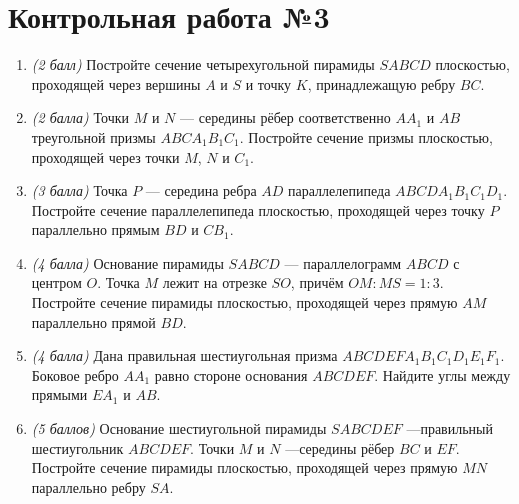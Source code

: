 \documentclass[12pt, a4paper]{article}
\begin{document}
\section*{Контрольная работа №3}
\begin{enumerate}
	\item \textit{(2 балл)} Постройте сечение четырехугольной пирамиды $SABCD$ плоскостью, проходящей через вершины $A$ и $S$ и точку $K$, принадлежащую ребру $BC$.
	\item \textit{(2 балла)} Точки $M$ и $N$ — середины рёбер соответственно $AA_1$ и $AB$ треугольной призмы $ABCA_1B_1C_1$. Постройте сечение призмы плоскостью, проходящей через точки $M$, $N$ и $C_1$.
	\item \textit{(3 балла)} Точка $P$ — середина ребра $AD$ параллелепипеда $ABCDA_1B_1C_1D_1$. Постройте сечение параллелепипеда плоскостью, проходящей через точку $P$ параллельно прямым $BD$ и $CB_1$.
	\item \textit{(4 балла)} Основание пирамиды $SABCD$ — параллелограмм $ABCD$ с центром $O$. Точка $M$ лежит на отрезке $SO$, причём $OM :MS = 1 : 3$. Постройте сечение пирамиды плоскостью, проходящей через
	прямую $AM$ параллельно прямой $BD$.
	\item \textit{(4 балла)} Дана правильная шестиугольная призма $ABCDEFA_1B_1C_1D_1E_1F_1$. Боковое ребро $AA_1$ равно стороне основания $ABCDEF$. Найдите углы между прямыми $EA_1$ и $AB$.
	\item \textit{(5 баллов)} Основание шестиугольной пирамиды $SABCDEF$ —правильный шестиугольник $ABCDEF$. Точки $M$ и $N$ —середины рёбер $BC$ и $EF$. Постройте сечение пирамиды плоскостью, проходящей через
	прямую $MN$ параллельно ребру $SA$.
\end{enumerate}
\end{document}
